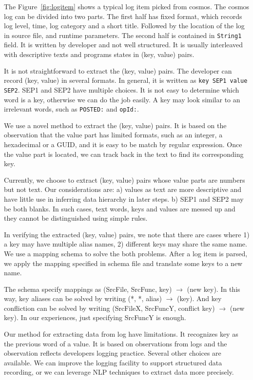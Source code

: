 The Figure~\ref{fig:logitem} shows a typical log item picked
from cosmos.  The cosmos log can be divided into two parts.
The first half has fixed format, which records log level,
time, log category and a short title. Followed by the
location of the log in source file, and runtime parameters.
The second half is contained in \texttt{String1} field. It
is written by developer and not well structured. It is
usually interleaved with descriptive texts and programs
states in (key, value) pairs.

It is not straightforward to extract the (key, value) pairs.
The developer can record (key, value) in several formats. In
general, it is written as \texttt{key SEP1 value SEP2}. SEP1
and SEP2 have multiple choices. It is not easy to determine
which word is a key, otherwise we can do the job easily. A
key may look similar to an irrelevant words, such as
\texttt{POSTED:} and \texttt{opId:}.

We use a novel method to extract the (key, value) pairs. It
is based on the observation that the value part has limited
formats, such as an integer, a hexadecimal or a GUID, and it
is easy to be match by regular expression. Once the value
part is located, we can track back in the text to find its
corresponding key.

Currently, we choose to extract (key, value) pairs whose
value parts are numbers but not text. Our considerations
are: a) values as text are more descriptive and have
little use in inferring data hierarchy in later steps. b)
SEP1 and SEP2 may be both blanks. In such cases,
text words, keys and values are messed up and they cannot be
distinguished using simple rules.

In verifying the extracted (key, value) pairs, we note that
there are cases where 1) a key may have multiple alias names,
2) different keys may share the same name. We use a mapping
schema to solve the both problems. After a log item is
parsed, we apply the mapping specified in schema file and
translate some keys to a new name.

The schema specify mappings as (SrcFile, SrcFunc, key) $\to$
(new key). In this way, key aliases can be solved by
writing (*, *, alias) $\to$ (key). And key confliction can
be solved by writing (SrcFileX, SrcFuncY, conflict key) $\to$
(new key). In our experiences, just specifying SrcFuncY is
enough.

Our method for extracting data from log have limitations. It
recognizes key as the previous word of a value. It is based
on observations from logs and the observation reflects
developers logging practice. Several other choices are
available. We can improve the logging facility to support
structured data recording, or we can leverage NLP techniques
to extract data more precisely.

